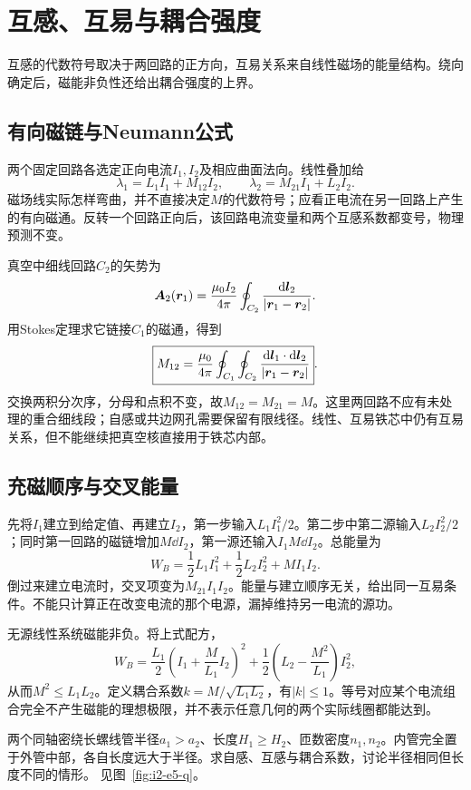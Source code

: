 \section{互感、互易与耦合强度}\label{sec:i2-mutual}
互感的代数符号取决于两回路的正方向，互易关系来自线性磁场的能量结构。绕向确定后，磁能非负性还给出耦合强度的上界。

\subsection{有向磁链与Neumann公式}
两个固定回路各选定正向电流$I_1,I_2$及相应曲面法向。线性叠加给
\[\lambda_1=L_1I_1+M_{12}I_2,\qquad
\lambda_2=M_{21}I_1+L_2I_2.
\]
磁场线实际怎样弯曲，并不直接决定$M$的代数符号；应看正电流在另一回路上产生的有向磁通。反转一个回路正向后，该回路电流变量和两个互感系数都变号，物理预测不变。

真空中细线回路$C_2$的矢势为
\[\bm{A}_2(\bm{r}_1)=\frac{\mu_0I_2}{4\pi}
\oint_{C_2}\frac{\mathop{}\!\mathrm d\bm{l}_2}{|\bm{r}_1-\bm{r}_2|}.
\]
用Stokes定理求它链接$C_1$的磁通，得到
\[\boxed{M_{12}=\frac{\mu_0}{4\pi}
\oint_{C_1}\oint_{C_2}\frac{\mathop{}\!\mathrm d\bm{l}_1\cdot\mathop{}\!\mathrm d\bm{l}_2}{|\bm{r}_1-\bm{r}_2|}}.
\]
交换两积分次序，分母和点积不变，故$M_{12}=M_{21}=M$。这里两回路不应有未处理的重合细线段；自感或共边网孔需要保留有限线径。线性、互易铁芯中仍有互易关系，但不能继续把真空核直接用于铁芯内部。

\subsection{充磁顺序与交叉能量}
先将$I_1$建立到给定值、再建立$I_2$，第一步输入$L_1I_1^2/2$。第二步中第二源输入$L_2I_2^2/2$；同时第一回路的磁链增加$M\dd I_2$，第一源还输入$I_1M\dd I_2$。总能量为
\[W_B=\frac12L_1I_1^2+\frac12L_2I_2^2+MI_1I_2.
\]
倒过来建立电流时，交叉项变为$M_{21}I_1I_2$。能量与建立顺序无关，给出同一互易条件。不能只计算正在改变电流的那个电源，漏掉维持另一电流的源功。

无源线性系统磁能非负。将上式配方，
\[W_B=\frac{L_1}{2}\left(I_1+\frac{M}{L_1}I_2\right)^2
+\frac12\left(L_2-\frac{M^2}{L_1}\right)I_2^2,
\]
从而$M^2\le L_1L_2$。定义耦合系数$k=M/\sqrt{L_1L_2}$，有$|k|\le1$。等号对应某个电流组合完全不产生磁能的理想极限，并不表示任意几何的两个实际线圈都能达到。


\begin{example}[嵌套长短螺线管的互感]\label{ex:i2-e5}
两个同轴密绕长螺线管半径$a_1>a_2$、长度$H_1\ge H_2$、匝数密度$n_1,n_2$。内管完全置于外管中部，各自长度远大于半径。求自感、互感与耦合系数，讨论半径相同但长度不同的情形。 见图~\ref{fig:i2-e5-q}。
\end{example}

